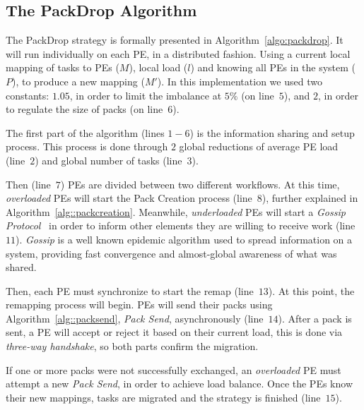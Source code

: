 \subsection{The PackDrop Algorithm}

The PackDrop strategy is formally presented in Algorithm~\ref{algo:packdrop}. 
It will run individually on each PE, in a distributed fashion. 
Using a current local mapping of tasks to PEs ($  M$), local load ($l$) and knowing all PEs in the system ($  P$), to produce a new mapping ($  M'$).
In this implementation we used two constants: $1.05$, in order to limit the imbalance at $5\%$ (on line~$5$), and $2$, in order to regulate the size of packs (on line~$6$).

The first part of the algorithm (lines $1-6$) is the information sharing and setup process. 
This process is done through $2$ global reductions of average PE load (line~$2$) and global number of tasks (line~$3$).

Then (line~$7$) PEs are divided between two different workflows.
At this time, \textit{overloaded} PEs will start the Pack Creation process (line~$8$), further explained in Algorithm~\ref{alg::packcreation}.
Meanwhile, \textit{underloaded} PEs will start a \textit{Gossip Protocol}~\cite{gossip} in order to inform other elements they are willing to receive work (line~$11$).
\textit{Gossip} is a well known epidemic algorithm used to spread information on a system, providing fast convergence and almost-global awareness of what was shared.

Then, each PE must synchronize to start the remap (line~$13$). 
At this point, the remapping process will begin.
PEs will send their packs using Algorithm~\ref{alg::packsend}, \textit{Pack Send}, asynchronously (line~$14$).
After a pack is sent, a PE will accept or reject it based on their current load, this is done via \textit{three-way handshake}, so both parts confirm the migration.

If one or more packs were not successfully exchanged, an \textit{overloaded} PE must attempt a new \textit{Pack Send}, in order to achieve load balance.
Once the PEs know their new mappings, tasks are migrated and the strategy is finished (line~$15$). 

